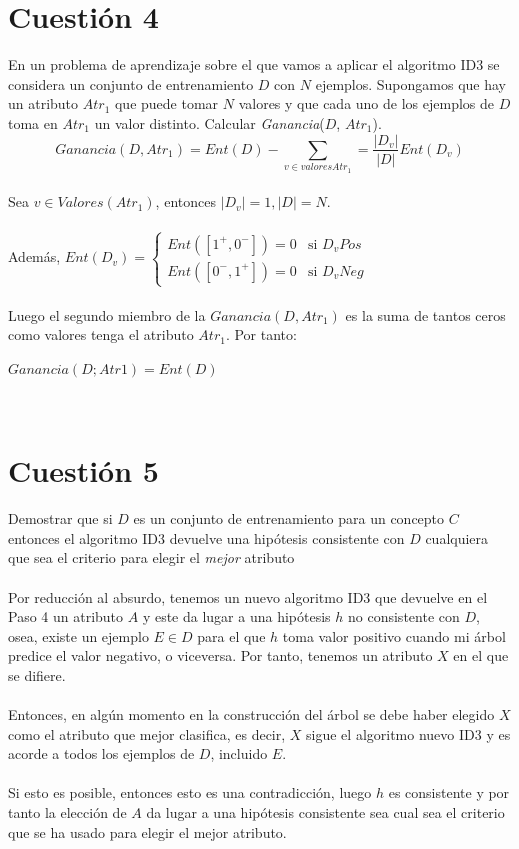 \documentclass{article}
\begin{document}
\section*{Cuestión 4}
En un problema de aprendizaje sobre el que vamos a aplicar el algoritmo ID3 se considera un conjunto de entrenamiento $D$ con $N$ ejemplos. Supongamos que hay un atributo $Atr_1$ que puede tomar $N$ valores y que cada uno de los ejemplos de $D$ toma en $Atr_1$ un valor distinto. Calcular \emph{Ganancia}($D$, $Atr_1$).\\
\[Ganancia(D, Atr_1)={Ent}(D)-
\sum_{v \in valores Atr_1 }=\frac{|D_v|}{|D|}{Ent}(D_v)\]\\
Sea \(v \in Valores(Atr_1)\), entonces \(|D_v| = 1, |D| = N\).\\\\
Además, \(Ent(D_v) =
\left\{
	\begin{array}{ll}
	    Ent([1^+,0^-]) = 0 & \mbox{si } D_v Pos  \\
		Ent([0^-,1^+]) = 0 & \mbox{si } D_v Neg
	\end{array}
\right.\)\\\\
Luego el segundo miembro de la ${Ganancia}(D, Atr_1)$ es la suma de tantos ceros como valores
tenga el atributo $Atr_1$. Por tanto:
\begin{center}$Ganancia(D; Atr1) = Ent(D)$\end{center}\\

\section*{Cuestión 5}
Demostrar que si $D$ es un conjunto de entrenamiento para un concepto $C$ entonces el algoritmo ID3 devuelve una hipótesis consistente con $D$ cualquiera que sea el criterio para elegir el \emph{mejor} atributo\\\\

Por reducción al absurdo, tenemos un nuevo algoritmo ID3 que devuelve en el Paso 4 un atributo $A$ y este da lugar a una hipótesis $h$ no consistente con $D$, osea, existe un ejemplo \(E \in D\) para el que $h$ toma valor positivo cuando mi árbol predice el valor negativo, o viceversa. Por tanto, tenemos un atributo $X$ en el que se difiere.\\\\
Entonces, en algún momento en la construcción del árbol se debe haber elegido $X$ como el atributo que mejor clasifica, es decir, $X$ sigue el algoritmo nuevo ID3 y es acorde a todos los ejemplos de $D$, incluido $E$.\\\\
Si esto es posible, entonces esto es una contradicción, luego $h$ es consistente y por tanto la elección de $A$ da lugar a una hipótesis consistente sea cual sea el criterio que se ha usado para elegir el mejor atributo.\\
\end{document}
